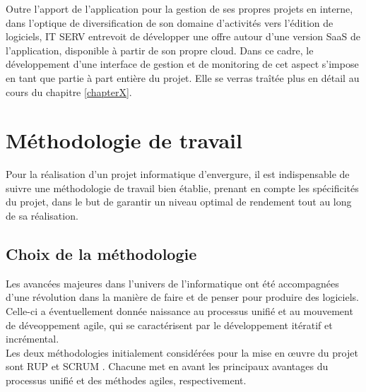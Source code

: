 \begin{spacing}{1.5}
Outre l'apport de l'application pour la gestion de ses propres projets en interne, dans l'optique de diversification de son domaine d'activités vers l'édition de logiciels, IT SERV entrevoit de développer une offre autour d'une version SaaS de l'application, disponible à partir de son propre cloud. Dans ce cadre, le développement d'une interface de gestion et de monitoring de cet aspect s'impose en tant que partie à part entière du projet. Elle se verras traîtée plus en détail au cours du chapitre \ref{chapterX}.


\section{Méthodologie de travail}
Pour la réalisation d'un projet informatique d'envergure, il est indispensable de suivre une méthodologie de travail bien établie, prenant en compte les spécificités du projet, dans le but de garantir un niveau optimal de rendement tout au long de sa réalisation.

\subsection{Choix de la méthodologie}
Les avancées majeures dans l'univers de l'informatique ont été accompagnées d'une révolution dans la manière de faire et de penser pour produire des logiciels. Celle-ci a éventuellement donnée naissance au processus unifié et au mouvement de déveoppement agile, qui se caractérisent par le développement itératif et incrémental.\\
Les deux méthodologies initialement considérées pour la mise en œuvre du projet sont RUP \cite{RUP} et SCRUM \cite{SCRUM}. Chacune met en avant les principaux avantages du processus unifié et des méthodes agiles, respectivement.\\


\end{spacing}
